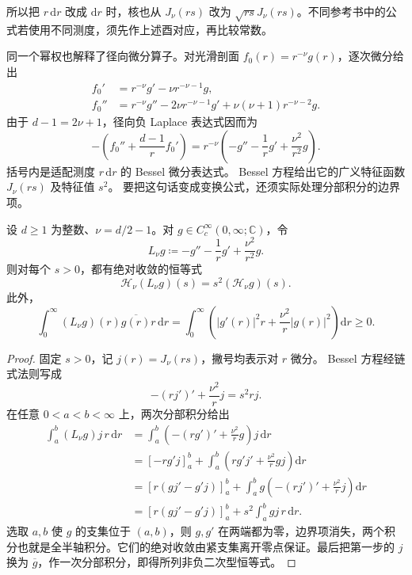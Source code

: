 所以把 \(r\,\mathrm dr\) 改成 \(\mathrm dr\) 时，核也从
\(J_\nu(rs)\) 改为 \(\sqrt{rs}J_\nu(rs)\)。不同参考书中的公式若使用不同测度，须先作上述酉对应，再比较常数。

\ProseParagraphBreak

同一个幂权也解释了径向微分算子。对光滑剖面
\(f_0(r)=r^{-\nu}g(r)\)，逐次微分给出
\[
\begin{aligned}
 f_0'&=r^{-\nu}g'-\nu r^{-\nu-1}g,\\
 f_0''&=r^{-\nu}g''-2\nu r^{-\nu-1}g'
            +\nu(\nu+1)r^{-\nu-2}g.
\end{aligned}
\]
由于 \(d-1=2\nu+1\)，径向负 Laplace 表达式因而为
\[
 -\left(f_0''+\frac{d-1}{r}f_0'\right)
 =r^{-\nu}\left(-g''-\frac1r g'+\frac{\nu^2}{r^2}g\right).
\]
括号内是适配测度 \(r\,\mathrm dr\) 的 Bessel 微分表达式。
Bessel 方程给出它的广义特征函数 \(J_\nu(rs)\) 及特征值 \(s^2\)。
要把这句话变成变换公式，还须实际处理分部积分的边界项。

\begin{proposition}
\label{b2:prop:A2-hankel-differential}
设 \(d\ge1\) 为整数、\(\nu=d/2-1\)。对
\(g\in C_c^\infty(0,\infty;\mathbb C)\)，令
\[
 L_\nu g\coloneqq -g''-\frac1r g'+\frac{\nu^2}{r^2}g.
\]
则对每个 \(s>0\)，都有绝对收敛的恒等式
\[
 \mathcal H_\nu(L_\nu g)(s)=s^2(\mathcal H_\nu g)(s).
\]
此外，
\[
 \int_0^\infty (L_\nu g)(r)\overline{g(r)}r\,\mathrm dr
 =\int_0^\infty
       \left(|g'(r)|^2r+\frac{\nu^2}{r}|g(r)|^2\right)\mathrm dr
 \ge0.
\]
\end{proposition}
\begin{proof}
固定 \(s>0\)，记 \(j(r)=J_\nu(rs)\)，撇号均表示对 \(r\) 微分。
Bessel 方程经链式法则写成
\[
 -(rj')'+\frac{\nu^2}{r}j=s^2rj.
\]
在任意 \(0<a<b<\infty\) 上，两次分部积分给出
\[
\begin{aligned}
 \int_a^b(L_\nu g)j\,r\,\mathrm dr
 &=\int_a^b\left(-(rg')'+\frac{\nu^2}{r}g\right)j\,\mathrm dr\\
 &=\left[-rg'j\right]_a^b
      +\int_a^b\left(rg'j'+\frac{\nu^2}{r}gj\right)\mathrm dr\\
 &=\left[r(gj'-g'j)\right]_a^b
      +\int_a^b g\left(-(rj')'+\frac{\nu^2}{r}j\right)\mathrm dr\\
 &=\left[r(gj'-g'j)\right]_a^b
      +s^2\int_a^b gj\,r\,\mathrm dr.
\end{aligned}
\]
选取 \(a,b\) 使 \(g\) 的支集位于 \((a,b)\)，则 \(g,g'\) 在两端都为零，边界项消失，两个积分也就是全半轴积分。它们的绝对收敛由紧支集离开零点保证。最后把第一步的 \(j\) 换为
\(\overline g\)，作一次分部积分，即得所列非负二次型恒等式。
\end{proof}

